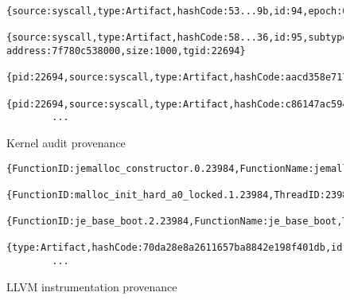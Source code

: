 \begin{figure*}[t]
  \begin{subfigure}[b]{\textwidth}
    {
      \scriptsize
      \begin{Verbatim}[gobble=8]
        {source:syscall,type:Artifact,hashCode:53...9b,id:94,epoch:0,path:/proc/sys/net/core/somaxconn,permissions:0644,subtype:file,version:0}
        {source:syscall,type:Artifact,hashCode:58...36,id:95,subtype:memory,version:1,memory address:7f780c538000,size:1000,tgid:22694}
        {pid:22694,source:syscall,type:Artifact,hashCode:aacd358e7170deccc70c2f88b52d4cef,id:96,epoch:0,subtype:unknown,version:8,fd:1}
        {pid:22694,source:syscall,type:Artifact,hashCode:c86147ac594fd4f80b476a6a928aaf56,id:97,epoch:0,subtype:unknown,version:9,fd:1}
        ...
      \end{Verbatim}
    }
    \caption{Kernel audit provenance}
  \end{subfigure}

  \vspace{0.5cm}

  \begin{subfigure}[b]{\textwidth}
    {
      \scriptsize
      \begin{Verbatim}[gobble=8]
        {FunctionID:jemalloc_constructor.0.23984,FunctionName:jemalloc_constructor,ThreadID:23984,type:Process,hashCode:bf...9d,id:0}
        {FunctionID:malloc_init_hard_a0_locked.1.23984,ThreadID:23984,type:Process,hashCode:10...ec,id:1}
        {FunctionID:je_base_boot.2.23984,FunctionName:je_base_boot,ThreadID:23984,type:Process,hashCode:a8...ec,id:2}
        {type:Artifact,hashCode:70da28e8a2611657ba8842e198f401db,id:5,ReturnType:i1,ReturnVal:0}
        ...
      \end{Verbatim}
    }
    \caption{LLVM instrumentation provenance}
  \end{subfigure}
  \caption{SPADE provenance}
\end{figure*}
